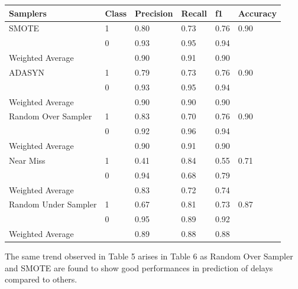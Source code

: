 \documentclass{article}
\begin{document}
\break
\begin{center}
 \label{tab:title} 
\begin{tabular}{ |p{2cm}|p{1cm}|p{2cm}|p{1cm}|p{1cm}|p{2cm}| }
 \hline
 Samplers & Class & Precision & Recall & f1 & Accuracy\\
 \hline
 SMOTE  & 1  & 0.80 & 0.73 & 0.76 & 0.90 \\
        & 0  & 0.93 & 0.95 & 0.94 &  \\
\hline
 Weighted Average & & 0.90 & 0.91 & 0.90 &  \\
 \hline
 \hline
 ADASYN   & 1  & 0.79 & 0.73 & 0.76 & 0.90 \\
          & 0  & 0.93 & 0.95 & 0.94 & \\
\hline
 Weighted Average & & 0.90 & 0.90 & 0.90 & \\
 \hline
 \hline
 Random Over Sampler  & 1  & 0.83 & 0.70 & 0.76 & 0.90\\
               & 0  & 0.92 & 0.96 & 0.94 & \\
\hline
 Weighted Average & & 0.90 & 0.91 & 0.90 & \\
 \hline
 \hline
 Near Miss  & 1  & 0.41 & 0.84 & 0.55 & 0.71\\
               & 0  & 0.94 & 0.68 & 0.79 & \\
\hline
 Weighted Average & & 0.83 & 0.72 & 0.74 & \\
 \hline
 \hline
 Random Under Sampler  & 1  & 0.67 & 0.81 & 0.73 & 0.87\\
               & 0  & 0.95 & 0.89 & 0.92 & \\
\hline
 Weighted Average & & 0.89 & 0.88 & 0.88 & \\
 \hline
\end{tabular}

\end{center}

The same trend observed in Table 5 arises in Table 6 as Random Over Sampler and SMOTE are found to show good performances in prediction of delays compared to others.
\end{document}
